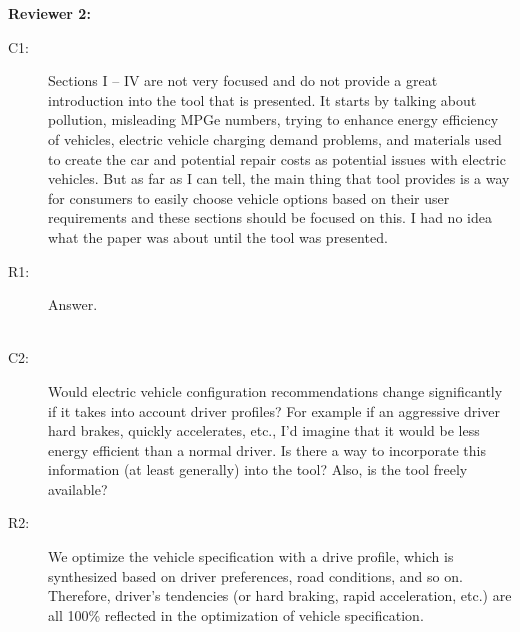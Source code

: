 \documentclass[onecolumn]{IEEEconf}
\begin{document}
\textbf{Reviewer 2:}
\begin{description}
\item [C1: ] Sections I -- IV are not very focused and do not provide a great introduction into the tool that is presented. It starts by talking about pollution, misleading MPGe numbers, trying to enhance energy efficiency of vehicles, electric vehicle charging demand problems, and materials used to create the car and potential repair costs as potential issues with electric vehicles. But as far as I can tell, the main thing that tool provides is a way for consumers to easily choose vehicle options based on their user requirements and these sections should be focused on this. I had no idea what the paper was about until the tool was presented.
\item [R1: ] Answer.\\
~\\

\item [C2: ] Would electric vehicle configuration recommendations change significantly if it takes into account driver profiles? For example if an aggressive driver hard brakes, quickly accelerates, etc., I'd imagine that it would be less energy efficient than a normal driver. Is there a way to incorporate this information (at least generally) into the tool? Also, is the tool freely available?
\item [R2: ] We optimize the vehicle specification with a drive profile, which is synthesized based on driver preferences, road conditions, and so on. Therefore, driver's tendencies (or hard braking, rapid acceleration, etc.) are all 100\% reflected in the optimization of vehicle specification.\\


\end{description}
\end{document}
